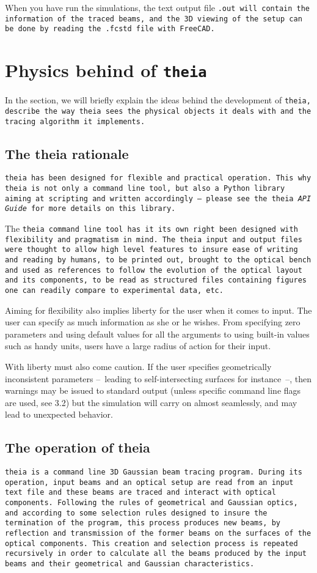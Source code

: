 \documentclass{article}
\begin{document}
When you have run the simulations, the text output file \tt{.out} will contain the information of the traced beams, and the 3D viewing of the setup can be done by reading the \tt{.fcstd} file with \tt{FreeCAD}.


\section{Physics behind of \tt{theia}}
In the section, we will briefly explain the ideas behind the development of \tt{theia}, describe the way \tt{theia} sees the physical objects it deals with and the tracing algorithm it implements.

\subsection{The theia rationale}
\tt{theia} has been designed for flexible and practical operation. This why \tt{theia} is not only a command line tool, but also a Python library aiming at scripting and written accordingly --~please see the theia \textit{API Guide} for more details on this library.

The \tt{theia} command line tool has it its own right been designed with flexibility and pragmatism in mind. The \tt{theia} input and output files were thought to allow high level features to insure ease of writing and reading by humans, to be printed out, brought to the optical bench and used as references to follow the evolution of the optical layout and its components, to be read as structured files containing figures one can readily compare to experimental data, etc.

Aiming for flexibility also implies liberty for the user when it comes to input. The user can specify as much information as she or he wishes. From specifying zero parameters and using default values for all the arguments to using built-in values such as handy units, users have a large radius of action for their input.

With liberty must also come caution. If the user specifies geometrically inconsistent parameters --~leading to self-intersecting surfaces for instance~--, then warnings may be issued to standard output (unless specific command line flags are used, see 3.2) but the simulation will carry on almost seamlessly, and may lead to unexpected behavior.

\subsection{The operation of theia}
\tt{theia} is a command line 3D Gaussian beam tracing program. During its operation, input beams and an optical setup are read from an input text file and these beams are traced and interact with optical components. Following the rules of geometrical and Gaussian optics, and according to some selection rules designed to insure the termination of the program, this process produces new beams, by reflection and transmission of the former beams on the surfaces of the optical components. This creation and selection process is repeated recursively in order to calculate all the beams produced by the input beams and their geometrical and Gaussian characteristics.
\end{document}
